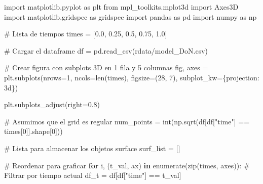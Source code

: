 \documentclass[
  spanish,
  us-letterpaper,
]{scrreprt}
\newenvironment{Shaded}{\begin{snugshade}}{\end{snugshade}}
\newcommand{\BuiltInTok}[1]{\textcolor[rgb]{0.00,0.23,0.31}{#1}}
\newcommand{\CommentTok}[1]{\textcolor[rgb]{0.37,0.37,0.37}{#1}}
\newcommand{\ControlFlowTok}[1]{\textcolor[rgb]{0.00,0.23,0.31}{\textbf{#1}}}
\newcommand{\DecValTok}[1]{\textcolor[rgb]{0.68,0.00,0.00}{#1}}
\newcommand{\FloatTok}[1]{\textcolor[rgb]{0.68,0.00,0.00}{#1}}
\newcommand{\ImportTok}[1]{\textcolor[rgb]{0.00,0.46,0.62}{#1}}
\newcommand{\KeywordTok}[1]{\textcolor[rgb]{0.00,0.23,0.31}{\textbf{#1}}}
\newcommand{\NormalTok}[1]{\textcolor[rgb]{0.00,0.23,0.31}{#1}}
\newcommand{\OperatorTok}[1]{\textcolor[rgb]{0.37,0.37,0.37}{#1}}
\newcommand{\StringTok}[1]{\textcolor[rgb]{0.13,0.47,0.30}{#1}}
\newcommand{\VerbatimStringTok}[1]{\textcolor[rgb]{0.13,0.47,0.30}{#1}}
\theoremstyle{definition}
\theoremstyle{plain}
\theoremstyle{remark}
\begin{document}
\begin{Shaded}
\begin{Highlighting}[]
\ImportTok{import}\NormalTok{ matplotlib.pyplot }\ImportTok{as}\NormalTok{ plt}
\ImportTok{from}\NormalTok{ mpl\_toolkits.mplot3d }\ImportTok{import}\NormalTok{ Axes3D}
\ImportTok{import}\NormalTok{ matplotlib.gridspec }\ImportTok{as}\NormalTok{ gridspec}
\ImportTok{import}\NormalTok{ pandas }\ImportTok{as}\NormalTok{ pd}
\ImportTok{import}\NormalTok{ numpy }\ImportTok{as}\NormalTok{ np}

\CommentTok{\# Lista de tiempos}
\NormalTok{times }\OperatorTok{=}\NormalTok{ [}\FloatTok{0.0}\NormalTok{, }\FloatTok{0.25}\NormalTok{, }\FloatTok{0.5}\NormalTok{, }\FloatTok{0.75}\NormalTok{, }\FloatTok{1.0}\NormalTok{]}

\CommentTok{\# Cargar el dataframe}
\NormalTok{df }\OperatorTok{=}\NormalTok{ pd.read\_csv(}\VerbatimStringTok{r\textquotesingle{}data/model\_DoN}\DecValTok{.}\VerbatimStringTok{csv\textquotesingle{}}\NormalTok{)  }

\CommentTok{\# Crear figura con subplots 3D en 1 fila y 5 columnas}
\NormalTok{fig, axes }\OperatorTok{=}\NormalTok{ plt.subplots(nrows}\OperatorTok{=}\DecValTok{1}\NormalTok{, ncols}\OperatorTok{=}\BuiltInTok{len}\NormalTok{(times), }
\NormalTok{                        figsize}\OperatorTok{=}\NormalTok{(}\DecValTok{28}\NormalTok{, }\DecValTok{7}\NormalTok{),}
\NormalTok{                        subplot\_kw}\OperatorTok{=}\NormalTok{\{}\StringTok{\textquotesingle{}projection\textquotesingle{}}\NormalTok{: }\StringTok{\textquotesingle{}3d\textquotesingle{}}\NormalTok{\})}

\NormalTok{plt.subplots\_adjust(right}\OperatorTok{=}\FloatTok{0.8}\NormalTok{)}

\CommentTok{\# Asumimos que el grid es regular}
\NormalTok{num\_points }\OperatorTok{=} \BuiltInTok{int}\NormalTok{(np.sqrt(df[df[}\StringTok{"time"}\NormalTok{] }\OperatorTok{==}\NormalTok{ times[}\DecValTok{0}\NormalTok{]].shape[}\DecValTok{0}\NormalTok{]))}

\CommentTok{\# Lista para almacenar los objetos surface}
\NormalTok{surf\_list }\OperatorTok{=}\NormalTok{ []}

\CommentTok{\# Reordenar para graficar}
\ControlFlowTok{for}\NormalTok{ i, (t\_val, ax) }\KeywordTok{in} \BuiltInTok{enumerate}\NormalTok{(}\BuiltInTok{zip}\NormalTok{(times, axes)):}
    \CommentTok{\# Filtrar por tiempo actual}
\NormalTok{    df\_t }\OperatorTok{=}\NormalTok{ df[df[}\StringTok{"time"}\NormalTok{] }\OperatorTok{==}\NormalTok{ t\_val]}


\end{Highlighting}
\end{Shaded}
\end{document}
